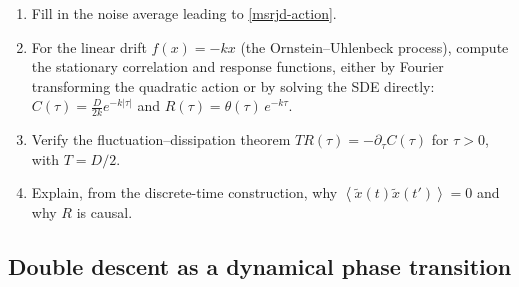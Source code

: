 \documentclass[11pt]{article}
\newcommand{\pd}{\partial}
\newcommand{\expval}[1]{\left\langle #1 \right\rangle}
\begin{document}
\begin{exercise}
\label{ex:msrjd}
\begin{enumerate}
  \item Fill in the noise average leading to \eqref{msrjd-action}.
  \item\label{ex:msrjd-ou} For the linear drift $f(x) = -k x$ (the Ornstein--Uhlenbeck process), compute the stationary correlation and response functions, either by Fourier transforming the quadratic action or by solving the SDE directly:
$C(\tau) = \frac{D}{2k} e^{-k|\tau|}$ and $R(\tau) = \theta(\tau)\, e^{-k\tau}$.
  \item Verify the fluctuation--dissipation theorem $T R(\tau) = -\pd_\tau C(\tau)$ for $\tau>0$, with $T = D/2$.
  \item Explain, from the discrete-time construction, why $\expval{\tilde x(t) \tilde x(t')} = 0$ and why $R$ is causal.
\end{enumerate}
\end{exercise}

\subsection{Double descent as a dynamical phase transition}
\label{sec:double-descent}
\end{document}
